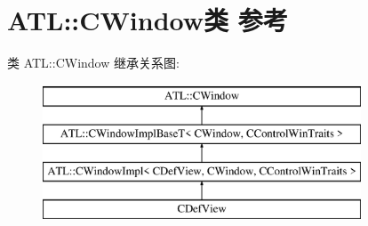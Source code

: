 \hypertarget{class_a_t_l_1_1_c_window}{}\section{A\+TL\+:\+:C\+Window类 参考}
\label{class_a_t_l_1_1_c_window}
类 A\+TL\+:\+:C\+Window 继承关系图\+:\begin{figure}[H]
\begin{center}
\leavevmode
\includegraphics[height=4.000000cm]{class_a_t_l_1_1_c_window}
\end{center}
\end{figure}
